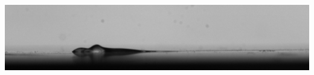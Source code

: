 \begin{titlepage}
    \begin{addmargin}[-1cm]{-3cm}
    \begin{center}
        \large

        \hfill

        \vfill

        \begingroup
            \color{CTtitle}\spacedallcaps{\myTitle} \\ \bigskip
        \endgroup

        \spacedlowsmallcaps{\myName}

        \vfill

        \includegraphics[height=0.2\linewidth]{gfx/test628} \\ \bigskip
        \fromUniversity\\
        \mySupervisor \\ \medskip
        \fromLab\\
        \myProf\\
        \myOtherProf \\
        \AnotherProf \\ \bigskip
        \mySubtitle \\ \medskip
        \spacedlowsmallcaps{\myDepartment} \\
        \spacedlowsmallcaps{\myFaculty} \\ \bigskip

        \myTime%

        \vfill

    \end{center}
  \end{addmargin}
\end{titlepage}
